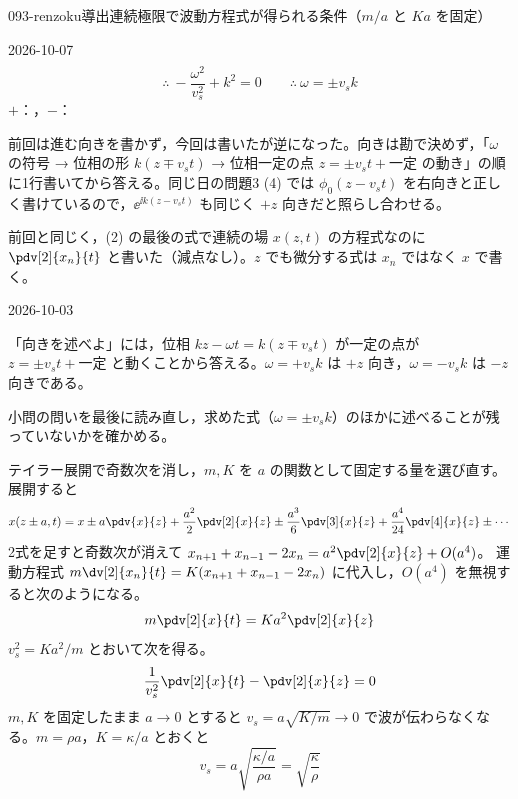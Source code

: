 \documentclass[uplatex,dvipdfmx,a4paper,11pt]{jsarticle}
\begin{document}
\begin{mondai}{093-renzoku}{導出}{連続極限で波動方程式が得られる条件（$m/a$ と $Ka$ を固定）}
\begin{kotaeutsushi}{2026-10-07}
\begin{align*}
\end{align*}
\[ \therefore\ -\frac{\omega^{2}}{v_s^{2}}+k^{2}=0\qquad\therefore\ \omega=\pm v_sk \]
$+$：，$-$：
\end{kotaeutsushi}
\begin{kizuki}
\item {} 前回は進む向きを書かず，今回は書いたが逆になった。向きは勘で決めず，「$\omega$ の符号 → 位相の形 $k(z\mp v_st)$ → 位相一定の点 $z=\pm v_st+\text{一定}$ の動き」の順に1行書いてから答える。同じ日の問題3 (4) では $\phi_0(z-v_st)$ を右向きと正しく書けているので，$\ee^{\ii k(z-v_st)}$ も同じく $+z$ 向きだと照らし合わせる。
\item {} 前回と同じく，(2) の最後の式で連続の場 $x(z,t)$ の方程式なのに $\pdv[2]{x_n}{t}$ と書いた（減点なし）。$z$ でも微分する式は $x_n$ ではなく $x$ で書く。
\end{kizuki}
\begin{maekizuki}{2026-10-03}
\item 「向きを述べよ」には，位相 $kz-\omega t=k(z\mp v_st)$ が一定の点が $z=\pm v_st+\text{一定}$ と動くことから答える。$\omega=+v_sk$ は $+z$ 向き，$\omega=-v_sk$ は $-z$ 向きである。
\item 小問の問いを最後に読み直し，求めた式（$\omega=\pm v_sk$）のほかに述べることが残っていないかを確かめる。
\end{maekizuki}
\begin{tadashii}
\houshin テイラー展開で奇数次を消し，$m,K$ を $a$ の関数として固定する量を選び直す。
\keisan
{} 展開すると
\[ x(z\pm a,t)=x\pm a\pdv{x}{z}+\frac{a^{2}}{2}\pdv[2]{x}{z}\pm\frac{a^{3}}{6}\pdv[3]{x}{z}+\frac{a^{4}}{24}\pdv[4]{x}{z}\pm\cdots \]
2式を足すと奇数次が消えて $x_{n+1}+x_{n-1}-2x_n=a^{2}\pdv[2]{x}{z}+O(a^{4})$。
 運動方程式 $m\dv[2]{x_n}{t}=K(x_{n+1}+x_{n-1}-2x_n)$ に代入し，$O(a^{4})$ を無視すると次のようになる。
\[ m\pdv[2]{x}{t}=Ka^{2}\pdv[2]{x}{z} \]
$v_s^{2}=Ka^{2}/m$ とおいて次を得る。
\[ \frac{1}{v_s^{2}}\pdv[2]{x}{t}-\pdv[2]{x}{z}=0 \]
 $m,K$ を固定したまま $a\to0$ とすると $v_s=a\sqrt{K/m}\to0$ で波が伝わらなくなる。$m=\rho a$，$K=\kappa/a$ とおくと
\[ v_s=a\sqrt{\frac{\kappa/a}{\rho a}}=\sqrt{\frac{\kappa}{\rho}} \]

\end{tadashii}
\end{mondai}
\end{document}

